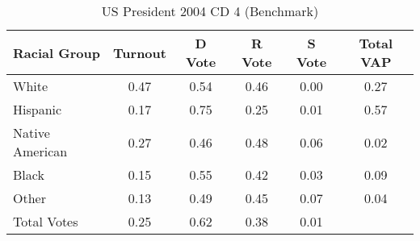 \begin{table}[htb]
\begin{center}
\caption{US President 2004 CD 4 (Benchmark)}
\label{pres04_vap_cd_4_benchmark}
\begin{tabular}{lccccc}
  \hline
Racial Group & Turnout & D Vote & R Vote & S Vote & Total VAP \\ 
  \hline
White & 0.47 & 0.54 & 0.46 & 0.00 & 0.27 \\ 
  Hispanic & 0.17 & 0.75 & 0.25 & 0.01 & 0.57 \\ 
  Native American & 0.27 & 0.46 & 0.48 & 0.06 & 0.02 \\ 
  Black & 0.15 & 0.55 & 0.42 & 0.03 & 0.09 \\ 
  Other & 0.13 & 0.49 & 0.45 & 0.07 & 0.04 \\ 
  Total Votes & 0.25 & 0.62 & 0.38 & 0.01 &  \\ 
   \hline
\end{tabular}
\end{center}
\end{table}
